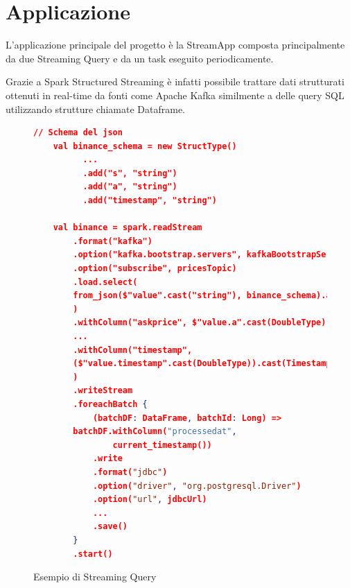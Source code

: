 \section{Applicazione}

L'applicazione principale del progetto è la StreamApp composta principalmente da due Streaming
Query e da un task eseguito periodicamente.

Grazie a Spark Structured Streaming è infatti possibile trattare dati strutturati ottenuti in
real-time da fonti come Apache Kafka similmente a delle query SQL utilizzando strutture chiamate
Dataframe.

\begin{figure}
    \begin{lstlisting}[language=json,firstnumber=1]
    // Schema del json
    val binance_schema = new StructType()
          ...
          .add("s", "string")
          .add("a", "string")
          .add("timestamp", "string")
    
    val binance = spark.readStream
        .format("kafka")
        .option("kafka.bootstrap.servers", kafkaBootstrapServers)
        .option("subscribe", pricesTopic)
        .load.select(
        from_json($"value".cast("string"), binance_schema).alias("value")
        )
        .withColumn("askprice", $"value.a".cast(DoubleType))
        ...
        .withColumn("timestamp",
        ($"value.timestamp".cast(DoubleType)).cast(TimestampType)
        )
        .writeStream
        .foreachBatch {
            (batchDF: DataFrame, batchId: Long) =>
        batchDF.withColumn("processedat",
                current_timestamp())
            .write
            .format("jdbc")
            .option("driver", "org.postgresql.Driver")
            .option("url", jdbcUrl)
            ...
            .save()
        }
        .start()
    \end{lstlisting}
    \caption{Esempio di Streaming Query}
    \label{streamingquery}
    \end{figure}

